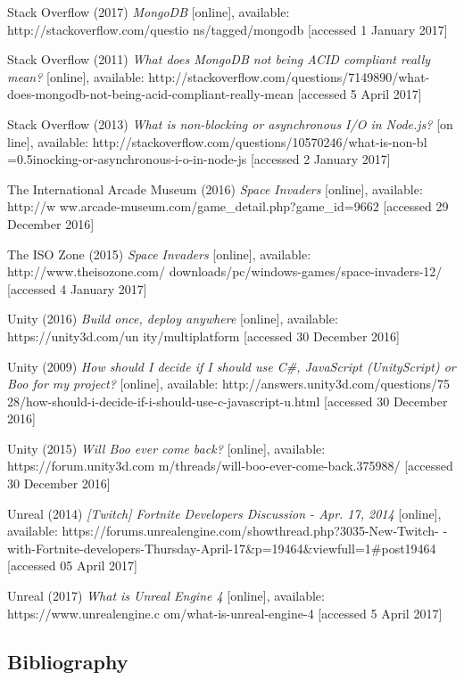 \documentclass[12pt]{article}
\begin{document}
Stack Overflow (2017) \textit{MongoDB} [online], available:
http://stackoverflow.com/questio
\hangindent=0.5in ns/tagged/mongodb [accessed 1 January 2017]

Stack Overflow (2011) \textit{What does MongoDB not being ACID compliant really mean?} [online], available: http://stackoverflow.com/questions/7149890/what-does-mongodb-not-being-acid-compliant-really-mean [accessed 5 April 2017]

Stack Overflow (2013) \textit{What is non-blocking or asynchronous I/O in Node.js?} [on
\hangindent=0.5in line], available: http://stackoverflow.com/questions/10570246/what-is-non-bl 
\hangindent=0.5inocking-or-asynchronous-i-o-in-node-js [accessed 2 January 2017]

The International Arcade Museum (2016) \textit{Space Invaders} [online], available: http://w
\hangindent=0.5in ww.arcade-museum.com/game{\_}detail.php?game{\_}id=9662 [accessed 29 December 2016]

The ISO Zone (2015) \textit{Space Invaders} [online], available:
http://www.theisozone.com/
\hangindent=0.5in downloads/pc/windows-games/space-invaders-12/
[accessed 4 January 2017]

Unity (2016) \textit{Build once, deploy anywhere} [online], available: https://unity3d.com/un
\hangindent=0.5in ity/multiplatform [accessed 30 December 2016]

Unity (2009) \textit{How should I decide if I should use C{\#}, JavaScript (UnityScript) or 
\hangindent=0.5in Boo for my project?} [online], available: http://answers.unity3d.com/questions/75
\hangindent=0.5in 28/how-should-i-decide-if-i-should-use-c-javascript-u.html [accessed 30 December 2016]

Unity (2015) \textit{Will Boo ever come back?} [online], available:
https://forum.unity3d.com
\hangindent=0.5in m/threads/will-boo-ever-come-back.375988/ [accessed 30
December 2016]

Unreal (2014) \textit{[Twitch] Fortnite Developers Discussion - Apr. 17, 2014} [online], \hangindent=0.5in available: https://forums.unrealengine.com/showthread.php?3035-New-Twitch-\hangindent=0.5in -with-Fortnite-developers-Thursday-April-17{\&}p=19464{\&}viewfull=1{\#}post19464 [accessed 05 April 2017]

Unreal (2017) \textit{What is Unreal Engine 4} [online], available: https://www.unrealengine.c
\hangindent=0.5in om/what-is-unreal-engine-4 [accessed 5 April 2017]

\newpage
\begin{center}
\section{Bibliography}
\end{center}

\end{document}
